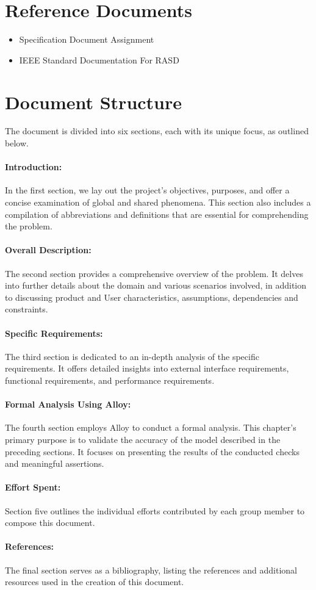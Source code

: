 \section{Reference Documents}
\label{sec:reference_documents}%
\begin{itemize}
    \item Specification Document Assignment
    \item IEEE Standard Documentation For RASD 
\end{itemize}

\newpage

\section{Document Structure}
\label{sec:document_structure}%
The document is divided into six sections, each with its unique focus, as outlined below.
\paragraph{Introduction:} In the first section, we lay out the project's objectives, purposes, and offer a concise examination of global and shared phenomena. This section also includes a compilation of abbreviations and definitions that are essential for comprehending the problem.
\paragraph{Overall Description:} The second section provides a comprehensive overview of the problem. It delves into further details about the domain and various scenarios involved, in addition to discussing product and User characteristics, assumptions, dependencies and constraints.
\paragraph{Specific Requirements:} The third section is dedicated to an in-depth analysis of the specific requirements. It offers detailed insights into external interface requirements, functional requirements, and performance requirements.
\paragraph{Formal Analysis Using Alloy:} The fourth section employs Alloy to conduct a formal analysis. This chapter's primary purpose is to validate the accuracy of the model described in the preceding sections. It focuses on presenting the results of the conducted checks and meaningful assertions.
\paragraph{Effort Spent:} Section five outlines the individual efforts contributed by each group member to compose this document.
\paragraph{References:} The final section serves as a bibliography, listing the references and additional resources used in the creation of this document.

